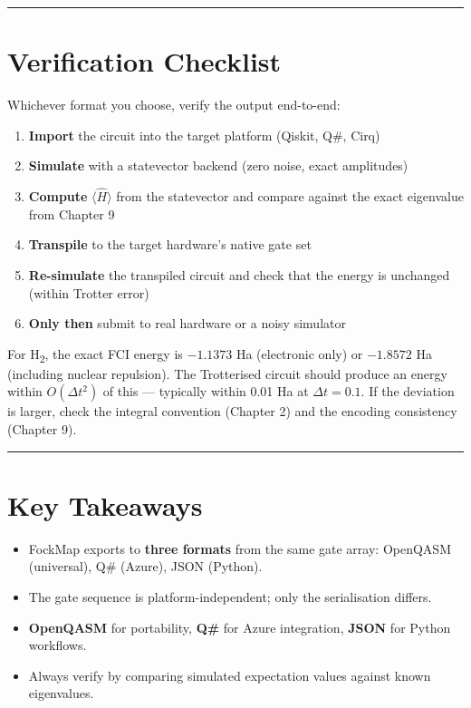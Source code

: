 \documentclass[
  11pt,
  oneside]{book}
\providecommand{\tightlist}{%
  \setlength{\itemsep}{0pt}\setlength{\parskip}{0pt}}
\begin{document}
\begin{center}\rule{0.5\linewidth}{0.5pt}\end{center}

\section{Verification Checklist}\label{verification-checklist}

Whichever format you choose, verify the output end-to-end:

\begin{enumerate}
\def\labelenumi{\arabic{enumi}.}
\tightlist
\item
  \textbf{Import} the circuit into the target platform (Qiskit, Q\#,
  Cirq)
\item
  \textbf{Simulate} with a statevector backend (zero noise, exact
  amplitudes)
\item
  \textbf{Compute} \(\langle\hat{H}\rangle\) from the statevector and
  compare against the exact eigenvalue from Chapter 9
\item
  \textbf{Transpile} to the target hardware's native gate set
\item
  \textbf{Re-simulate} the transpiled circuit and check that the energy
  is unchanged (within Trotter error)
\item
  \textbf{Only then} submit to real hardware or a noisy simulator
\end{enumerate}

For H\textsubscript{2}, the exact FCI energy is \(-1.1373\) Ha (electronic only) or
\(-1.8572\) Ha (including nuclear repulsion). The Trotterised circuit
should produce an energy within \(O(\Delta t^2)\) of this --- typically
within 0.01 Ha at \(\Delta t = 0.1\). If the deviation is larger, check
the integral convention (Chapter 2) and the encoding consistency
(Chapter 9).

\begin{center}\rule{0.5\linewidth}{0.5pt}\end{center}

\section{Key Takeaways}\label{key-takeaways-20}

\begin{itemize}
\tightlist
\item
  FockMap exports to \textbf{three formats} from the same gate array:
  OpenQASM (universal), Q\# (Azure), JSON (Python).
\item
  The gate sequence is platform-independent; only the serialisation
  differs.
\item
  \textbf{OpenQASM} for portability, \textbf{Q\#} for Azure integration,
  \textbf{JSON} for Python workflows.
\item
  Always verify by comparing simulated expectation values against known
  eigenvalues.
\end{itemize}
\end{document}
